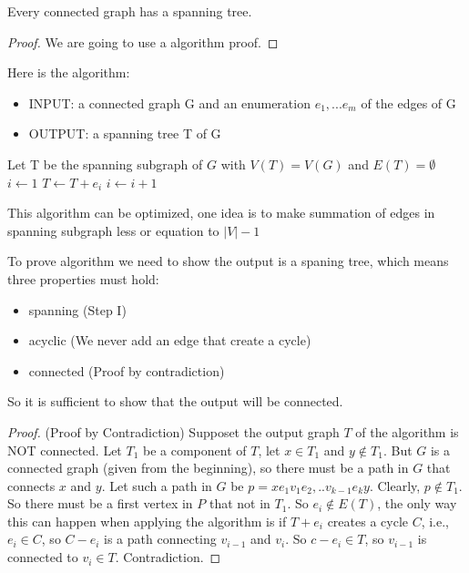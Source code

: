 			Every connected graph has a spanning tree.

			\begin{proof}
				We are going to use a algorithm proof.				
			\end{proof}

			Here is the algorithm:\\
			\begin{itemize}
				\item INPUT: a connected graph G and an enumeration $e_1,...e_m$ of the edges of G
				\item OUTPUT: a spanning tree T of G
			\end{itemize}

			\begin{algorithmic}[!ht]
				\STATE Let T be the spanning subgraph of $G$ with $V(T)=V(G)$ and $E(T)=\emptyset$
				\STATE $i \gets 1$
						\STATE $T \gets T + e_i$
						\STATE $i \gets i + 1$
					\ENDIF
				\ENDWHILE
			\end{algorithmic}

			This algorithm can be optimized, one idea is to make summation of edges in spanning subgraph less or equation to $|V| - 1$

			To prove algorithm we need to show the output is a spaning tree, which means three properties must hold:
			\begin{itemize}
				\item spanning (Step I)
				\item acyclic (We never add an edge that create a cycle)
				\item connected (Proof by contradiction)
			\end{itemize}
			So it is sufficient to show that the output will be connected.
			\begin{proof}
				(Proof by Contradiction) Supposet the output graph $T$ of the algorithm is NOT connected. Let $T_1$ be a component of $T$, let $x\in T_1$ and $y \notin T_1$. But $G$ is a connected graph (given from the beginning), so there must be a path in $G$ that connects $x$ and $y$. Let such a path in $G$ be $p=xe_1v_1e_2,..v_{k-1}e_ky$. Clearly, $p\notin T_1$. So there must be a first vertex in $P$ that not in $T_1$. So $e_i \notin E(T)$, the only way this can happen when applying the algorithm is if $T + e_i$ creates a cycle $C$, i.e., $e_i \in C$, so $C - e_i$ is a path connecting $v_{i-1}$ and $v_i$. So $c - e_i \in T$, so $v_{i-1}$ is connected to $v_i \in T$. Contradiction. 
			\end{proof}

